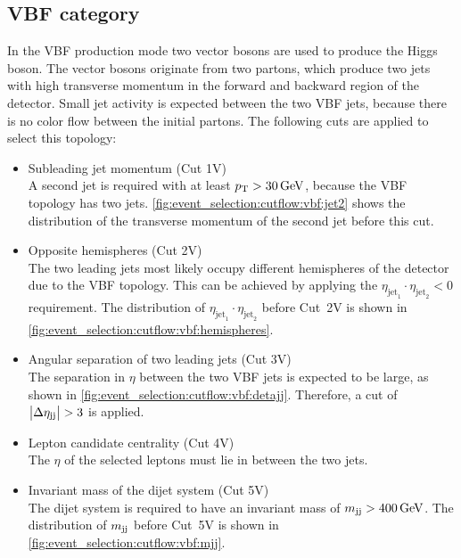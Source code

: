 \subsection{VBF category}\label{sub:event_selection:vbf}

In the VBF production mode two vector bosons are used to produce the Higgs boson.
The vector bosons originate from two partons, which produce two jets with high transverse momentum
in the forward and backward region of the detector.
Small jet activity is expected between the two VBF jets, because there is no color flow between the initial partons.
The following cuts are applied to select this topology:

\begin{itemize}
    \item Subleading jet momentum (Cut 1V) \\
        A second jet is required with at least $\pt > \SI{30}{\GeV}$, because the VBF topology has two jets.
        \cref{fig:event_selection:cutflow:vbf:jet2} shows the distribution of the transverse momentum of the second
        jet before this cut.
    \item Opposite hemispheres (Cut 2V) \\
        The two leading jets most likely occupy different hemispheres of the detector due to the VBF topology.
        This can be achieved by applying the $\eta_{\text{jet}_1} \cdot \eta_{\text{jet}_2} < 0$ requirement.
        The distribution of $\eta_{\text{jet}_1} \cdot \eta_{\text{jet}_2}$ before Cut~2V is shown in \cref{fig:event_selection:cutflow:vbf:hemispheres}.
    \item Angular separation of two leading jets (Cut 3V) \\
        The separation in $\eta$ between the two VBF jets is expected to be large, as shown in \cref{fig:event_selection:cutflow:vbf:detajj}.
        Therefore, a cut of $\left|\Delta \eta_\text{jj}\right| > 3$ is applied.
    \item Lepton candidate centrality (Cut 4V) \\
        The $\eta$ of the selected leptons must lie in between the two jets.
    \item Invariant mass of the dijet system (Cut 5V) \\
        The dijet system is required to have an invariant mass of $\mjj > \SI{400}{\GeV}$.
        The distribution of $m_{\text{jj}}$ before Cut~5V is shown in \cref{fig:event_selection:cutflow:vbf:mjj}.
\end{itemize}

